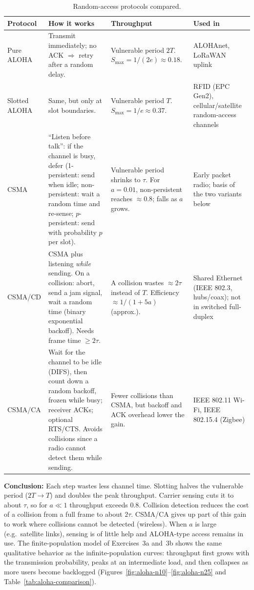 ﻿\documentclass[12pt]{article}
\begin{document}
\begin{table}[H]
    \centering \small
    \caption{Random-access protocols compared.}
    \label{tab:mac}
    \begin{tabular}{p{1.9cm}p{4.8cm}p{4.4cm}p{3.4cm}}
        \hline
        Protocol & How it works & Throughput & Used in \\
        \hline
        Pure ALOHA & Transmit immediately; no ACK $\Rightarrow$ retry after a random delay.
          & Vulnerable period $2T$. $S_{\max}=1/(2e)\approx0.18$.
          & ALOHAnet, LoRaWAN uplink \\
        Slotted ALOHA & Same, but only at slot boundaries.
          & Vulnerable period $T$. $S_{\max}=1/e\approx0.37$.
          & RFID (EPC Gen2), cellular/satellite random-access channels \\
        CSMA & ``Listen before talk'': if the channel is busy, defer
          (1-persistent: send when idle; non-persistent: wait a random time and re-sense;
          $p$-persistent: send with probability $p$ per slot).
          & Vulnerable period shrinks to $\tau$. For $a=0.01$, non-persistent reaches $\approx0.8$; falls as $a$ grows.
          & Early packet radio; basis of the two variants below \\
        CSMA/CD & CSMA plus listening \emph{while} sending. On a collision: abort,
          send a jam signal, wait a random time (binary exponential backoff).
          Needs frame time $\ge 2\tau$.
          & A collision wastes $\approx2\tau$ instead of $T$. Efficiency $\approx 1/(1+5a)$ (approx.).
          & Shared Ethernet (IEEE 802.3, hubs/coax); not in switched full-duplex \\
        CSMA/CA & Wait for the channel to be idle (DIFS), then count down a random
          backoff, frozen while busy; receiver ACKs; optional RTS/CTS.
          Avoids collisions since a radio cannot detect them while sending.
          & Fewer collisions than CSMA, but backoff and ACK overhead lower the gain.
          & IEEE 802.11 Wi-Fi, IEEE 802.15.4 (Zigbee) \\
        \hline
    \end{tabular}
\end{table}

\textbf{Conclusion:} Each step wastes less channel time. Slotting halves the
vulnerable period ($2T\to T$) and doubles the peak throughput. Carrier sensing
cuts it to about $\tau$, so for $a\ll1$ throughput exceeds $0.8$. Collision
detection reduces the cost of a collision from a full frame to about $2\tau$.
CSMA/CA gives up part of this gain to work where collisions cannot be detected
(wireless). When $a$ is large (e.g.\ satellite links), sensing is of little
help and ALOHA-type access remains in use. The finite-population model of
Exercises~3a and~3b shows the same qualitative behavior as the
infinite-population curves: throughput first grows with the transmission
probability, peaks at an intermediate load, and then collapses as more users
become backlogged (Figures~\ref{fig:aloha-n10}--\ref{fig:aloha-n25} and
Table~\ref{tab:aloha-comparison}).
\end{document}
